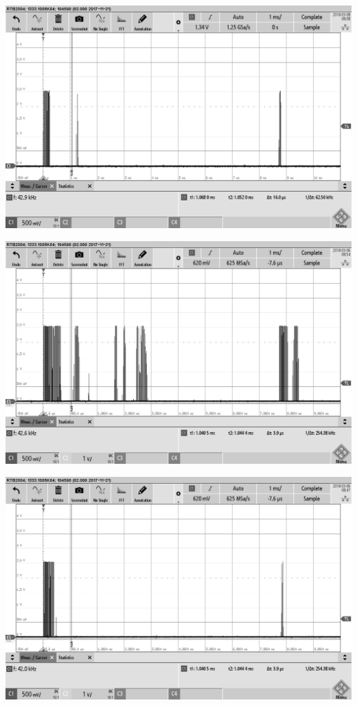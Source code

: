 \begin{minipage}{0.5\textwidth}
\includegraphics[width=1\textwidth, draft]{Abbildungen/Messungen4,6V/EKULIT1,5m.png}
\label{fig:EKULIT1,5m}
\end{minipage}
\begin{minipage}{0.5\textwidth}
\includegraphics[width=1\textwidth, draft]{Abbildungen/Messungen4,6V/MURATAr1,5m.png}
\label{fig:EKULIT1,5m}
\end{minipage}
\begin{minipage}{0.5\textwidth}
\includegraphics[width=1\textwidth, draft]{Abbildungen/Messungen4,6V/MURATAs1,5m.png}
\label{fig:EKULIT1,5m}
\end{minipage}
